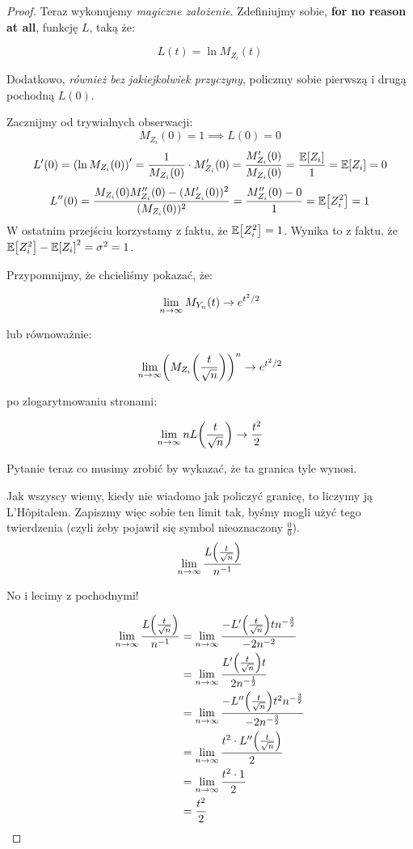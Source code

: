 \begin{proof}
	Teraz wykonujemy \textit{magiczne założenie}. Zdefiniujmy sobie, \textbf{for no reason at all}, funkcję \(L\), taką że:

	\[
		L(t) = \ln M_{Z_i}(t)
	\]

	Dodatkowo, \textit{również bez jakiejkolwiek przyczyny}, policzmy sobie pierwszą i drugą pochodną \(L(0)\).

	Zacznijmy od trywialnych obserwacji:
	\[
		M_{Z_i}(0) = 1 \implies L(0) = 0
	\]
	\[
		L'(0) = \pars{\ln M_{Z_i}(0)}' = \frac{1}{M_{Z_i}(0)} \cdot M'_{Z_i}(0) = \frac{M_{Z_i}'(0)}{M_{Z_i}(0)} = \frac{\expected{Z_i}}{1} = \expected{Z_i} = 0
	\]
	\[
		L''(0) = \frac{M_{Z_i}(0)M_{Z_i}''(0) - (M_{Z_i}'(0))^2}{(M_{Z_i}(0))^2} = \frac{M_{Z_i}''(0) - 0}{1} = \expected{Z_i^2} = 1
	\]
	W ostatnim przejściu korzystamy z faktu, że \( \expected{Z_{i}^2} = 1\). Wynika to z faktu, że \( \expected{Z_{i}^2} - \expected{Z_{i}}^2 = \sigma^2 = 1\).

	Przypomnijmy, że chcieliśmy pokazać, że:


	\[
		\lim_{n\to\infty}M_{Y_n}\pars{t} \to e^{t^2/2}
	\]

	lub równoważnie:

	\[
		\lim_{n \to \infty } \pars{M_{Z_i}\pars{\frac{t}{\sqrt{n}}}}^n \to e^{t^2 / 2}
	\]

	po zlogarytmowaniu stronami:

	\[
		\lim_{n \to \infty} nL\pars{\frac{t}{\sqrt{n}}} \to \frac{t^2}{2}
	\]

	Pytanie teraz co musimy zrobić by wykazać, że ta granica tyle wynosi.

	Jak wszyscy wiemy, kiedy nie wiadomo jak policzyć granicę, to liczymy ją L’Hôpitalem. Zapiszmy więc sobie ten limit tak, byśmy mogli użyć tego twierdzenia (czyli żeby pojawił się symbol nieoznaczony \( \frac{0}{0} \)).
	\[
		\lim_{n \to \infty}\frac{L\pars{\frac{t}{\sqrt{n}}}}{n^{-1}}
	\]

	No i lecimy z pochodnymi!

	\begin{align*}
		\lim_{n \to \infty}\frac{L \pars{\frac{t}{\sqrt{n}}}}{n^{-1}} & = \lim_{n \to \infty}\frac{-L'\pars{\frac{t}{\sqrt{n}}}tn^{-\frac{3}{2}}}{-2n^{-2}}               \\
		                                                              & = \lim_{n \to \infty}\frac{L'\pars{\frac{t}{\sqrt{n}}}t}{2n^{-\frac{1}{2}}}                       \\
		                                                              & = \lim_{n \to \infty}\frac{-L''\pars{\frac{t}{\sqrt{n}}}t^2 n^{-\frac{3}{2}}}{-2n^{-\frac{3}{2}}} \\
		                                                              & = \lim_{n \to \infty} \frac{t^2 \cdot L''\pars{\frac{t}{\sqrt{n}}}}{2}                            \\
		                                                              & = \lim_{n \to \infty} \frac{t^2 \cdot 1 }{2}                                                      \\
		                                                              & = \frac{t^2}{2}
	\end{align*}


\end{proof}
